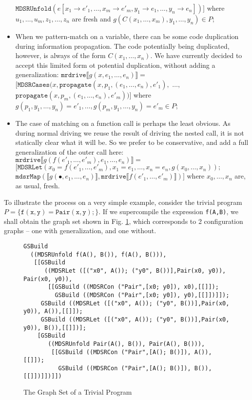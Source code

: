 \documentclass[submission,copyright,creativecommons]{eptcs}
\begin{document}
\begin{itemize}
    $\mathtt{MDSRUnfold}(e [ x_1\rightarrow e'_1, \ldots, x_m\rightarrow e'_m, y_1 \rightarrow e_1, \ldots, y_n \rightarrow e_n ])]$
    where $u_1, \ldots, u_m, z_1, \ldots, z_n$ are fresh and $g(C(x_1, \ldots, x_m), y_1, \ldots, y_n) \in P$;
  \item When we pattern-match on a variable, there can be some code duplication during
    information propagation. 
    The code potentially being duplicated, however, is always of the form $C(x_1, \ldots, x_n)$.
    We have currently decided to accept this limited form ot potential duplication, without adding a generalization:
    $\mathtt{mrdrive} \llbracket g(x, e_1, \ldots, e_n) \rrbracket =$
    $[\mathtt{MDSRCases}(x, \mathtt{propagate}(x, p_1, (e_1, \ldots, e_n), e'_1),$ $\ldots,$ \\
    $\mathtt{propagate}(x, p_m, (e_1, \ldots, e_n), e'_m))]$
    where $g(p_1, y_1, \ldots, y_n) = e'_1, \ldots, g(p_m, y_1, \ldots, y_n) = e'_m \in P$;
    
  \item The case of matching on a function call is perhaps the least obvious. 
    As during normal driving we reuse the result of driving the nested call, it is not statically clear what
    it will be.
    So we prefer to be conservative, and add a full generalization of the outer call here:
    $\mathtt{mrdrive} \llbracket g(f(e'_1, \ldots, e'_m), e_1, \ldots, e_n) \rrbracket =$
    $[\mathtt{MDSRLet}(x_0=f(e'_1, \ldots, e'_m), x_1=e_1, \ldots, x_n=e_n, g(x_0, \ldots, x_n));$ \\
    $\mathtt{mdsrMap}(\llbracket g(\bullet, e_1, \ldots, e_n) \rrbracket, \mathtt{mrdrive} \llbracket f(e'_1, \ldots, e'_m) \rrbracket)]$
    where $x_0, \ldots, x_n$ are, as usual, fresh.
\end{itemize}

To illustrate the process on a very simple example, consider the trivial program 
$P = \{ \mathtt{f(x,y)=Pair(x,y);} \}$. 
If we supercompile the expression \verb|f(A,B)|, we shall obtain the graph set shown in Fig. \ref{fig:TrivGraphSet},
which corresponds to 2 configuration graphs -- one with generalization, and one without.

\begin{figure}
\begin{lstlisting}
GSBuild
  ((MDSRUnfold f(A(), B()), f(A(), B())),
   [[GSBuild
      ((MDSRLet ([("x0", A()); ("y0", B())],Pair(x0, y0)), Pair(x0, y0)),
       [[GSBuild ((MDSRCon ("Pair",[x0; y0]), x0),[[]]);
         GSBuild ((MDSRCon ("Pair",[x0; y0]), y0),[[]])]]);
     GSBuild ((MDSRLet ([("x0", A()); ("y0", B())],Pair(x0, y0)), A()),[[]]);
     GSBuild ((MDSRLet ([("x0", A()); ("y0", B())],Pair(x0, y0)), B()),[[]])];
    [GSBuild
       ((MDSRUnfold Pair(A(), B()), Pair(A(), B())),
        [[GSBuild ((MDSRCon ("Pair",[A(); B()]), A()),[[]]);
          GSBuild ((MDSRCon ("Pair",[A(); B()]), B()),[[]])]])]])
\end{lstlisting}
\caption{The Graph Set of a Trivial Program}
\label{fig:TrivGraphSet}
\end{figure}
\end{document}
